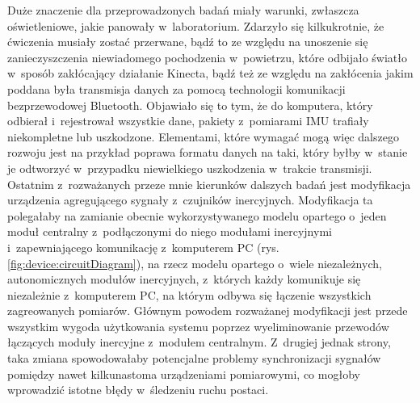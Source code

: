 Duże znaczenie dla przeprowadzonych badań miały warunki, zwłaszcza oświetleniowe, jakie panowały w~laboratorium. Zdarzyło się kilkukrotnie, że ćwiczenia musiały zostać przerwane, bądź to ze względu na unoszenie się zanieczyszczenia niewiadomego pochodzenia w~powietrzu, które odbijało światło w~sposób zakłócający działanie Kinecta, bądź też ze względu na zakłócenia jakim poddana była transmisja danych za pomocą technologii  komunikacji bezprzewodowej Bluetooth. Objawiało się to tym, że do komputera, który odbierał i~rejestrował wszystkie dane, pakiety z~pomiarami IMU trafiały niekompletne lub uszkodzone. Elementami, które wymagać mogą więc dalszego rozwoju jest na przykład poprawa formatu danych na taki, który byłby w~stanie je odtworzyć w~przypadku niewielkiego uszkodzenia w~trakcie transmisji.
Ostatnim z~rozważanych przeze mnie kierunków dalszych badań jest modyfikacja urządzenia agregującego sygnały z~czujników inercyjnych. Modyfikacja ta polegałaby na zamianie obecnie wykorzystywanego modelu opartego o~jeden moduł centralny z~podłączonymi do niego modułami inercyjnymi i~zapewniającego komunikację z~komputerem PC (rys. \ref{fig:device:circuitDiagram}), na rzecz modelu opartego o~wiele niezależnych, autonomicznych modułów inercyjnych, z~których każdy komunikuje się niezależnie z~komputerem PC, na którym odbywa się łączenie wszystkich zagreowanych pomiarów. Głównym powodem rozważanej modyfikacji jest przede wszystkim wygoda użytkowania systemu poprzez wyeliminowanie przewodów łączących moduły inercyjne z~modułem centralnym. Z~drugiej jednak strony, taka zmiana spowodowałaby potencjalne problemy synchronizacji sygnałów pomiędzy nawet kilkunastoma urządzeniami pomiarowymi, co mogłoby wprowadzić istotne błędy w~śledzeniu ruchu postaci.